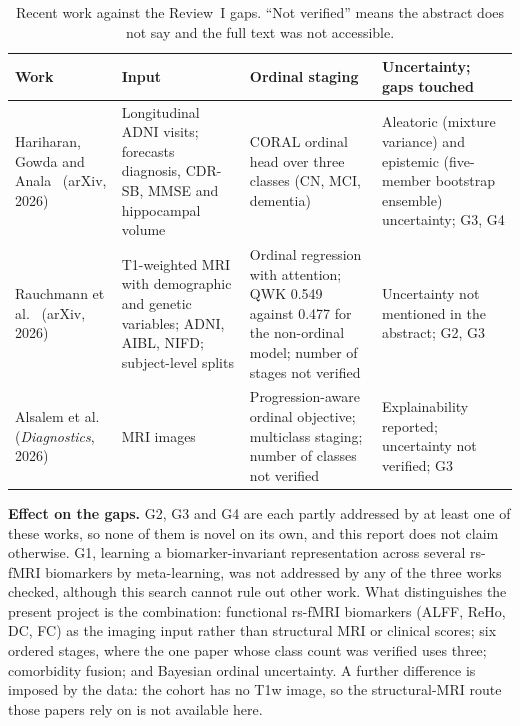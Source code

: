 \documentclass{ssnreview}
\begin{document}
\begin{table}[!htbp]
\centering
\caption[Recent work against the Review~I gaps]{Recent work against the Review~I gaps. ``Not verified'' means the abstract does
not say and the full text was not accessible.}
\label{tab:litupdate}
\footnotesize
\begin{tabularx}{\textwidth}{@{}>{\raggedright\arraybackslash}p{2.5cm}>{\raggedright\arraybackslash}p{3.6cm}>{\raggedright\arraybackslash}p{4.4cm}>{\raggedright\arraybackslash}X@{}}
\toprule
\textbf{Work} & \textbf{Input} & \textbf{Ordinal staging} & \textbf{Uncertainty; gaps touched} \\
\midrule
Hariharan, Gowda and Anala~\cite{hariharan2026} (arXiv, 2026) & Longitudinal ADNI visits;
forecasts diagnosis, CDR-SB, MMSE and hippocampal volume & CORAL ordinal head over three
classes (CN, MCI, dementia) & Aleatoric (mixture variance) and epistemic (five-member
bootstrap ensemble) uncertainty; G3, G4 \\
Rauchmann et al.~\cite{rauchmann2026} (arXiv, 2026) & T1-weighted MRI with demographic and
genetic variables; ADNI, AIBL, NIFD; subject-level splits & Ordinal regression with
attention; QWK 0.549 against 0.477 for the non-ordinal model; number of stages not
verified & Uncertainty not mentioned in the abstract; G2, G3 \\
Alsalem et al.~\cite{alsalem2026} (\textit{Diagnostics}, 2026) & MRI images & Progression-aware
ordinal objective; multiclass staging; number of classes not verified & Explainability
reported; uncertainty not verified; G3 \\
\bottomrule
\end{tabularx}
\end{table}

\textbf{Effect on the gaps.} G2, G3 and G4 are each partly addressed by at least one of
these works, so none of them is novel on its own, and this report does not claim
otherwise. G1, learning a biomarker-invariant representation across several rs-fMRI
biomarkers by meta-learning, was not addressed by any of the three works checked, although
this search cannot rule out other work. What distinguishes the present project is the
combination: functional rs-fMRI biomarkers (ALFF, ReHo, DC, FC) as the imaging input
rather than structural MRI or clinical scores; six ordered stages, where the one paper
whose class count was verified uses three; comorbidity fusion; and Bayesian ordinal
uncertainty. A further difference is imposed by the data: the cohort has no T1w image, so
the structural-MRI route those papers rely on is not available here.
\end{document}
